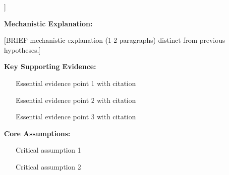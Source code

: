 \documentclass[11pt,letterpaper]{article}
\begin{document}
\begin{hypothesisbox3}[Hypothesis 3: [Title]]

\textbf{Mechanistic Explanation:}

[BRIEF mechanistic explanation (1-2 paragraphs) distinct from previous hypotheses.]

\vspace{0.2cm}

\textbf{Key Supporting Evidence:}
\begin{itemize}
  \item [Essential evidence point 1 with citation]
  \item [Essential evidence point 2 with citation]
  \item [Essential evidence point 3 with citation]
\end{itemize}

\vspace{0.2cm}

\textbf{Core Assumptions:}
\begin{enumerate}
  \item [Critical assumption 1]
  \item [Critical assumption 2]
\end{enumerate}

\end{hypothesisbox3}

\vspace{0.3cm}



\end{document}
